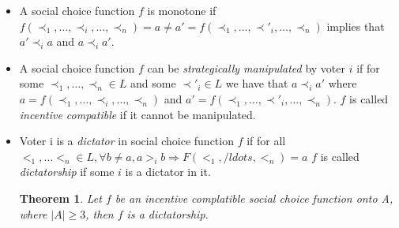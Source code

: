 \documentclass{article}
\newtheorem{theorem}{Theorem}
\theoremstyle{definition}
\begin{document}
\begin{itemize}
\item
A social choice function $f$ is monotone if
$f(\prec_1,\dots,\prec_i,\dots,\prec_n)=a\ne a'=f(\prec_1,\dots,\prec'_i,\dots,\prec_n)$
implies that $a'\prec_i a$ and $a\prec_i a'$.

\item
A social choice function $f$ can be \emph{strategically manipulated} by
voter $i$ if for some $\prec_1,\dots,\prec_n\in L$ and some $\prec'_i\in L$
we have that $a \prec_i a'$ where $a=f(\prec_1,\dots,\prec_i,\dots,\prec_n)$
and $a'=f(\prec_1,\dots,\prec'_i,\dots,\prec_n)$.
$f$ is called \emph{incentive compatible} if it cannot be manipulated.

\item Voter i is a \emph{dictator} in social choice function $f$ if for all
$<_1, \ldots <_n \in L, \forall b \neq a, a >_i b \Rightarrow F(<_1, /ldots, <_n) = a$
$f$ is called \emph{dictatorship} if some $i$ is a dictator in it.

\begin{theorem}
Let $f$ be an incentive complatible social choice function onto A, where $|A| \geq 3$, then $f$
is a dictatorship.
\end{theorem}

\end{itemize}
\end{document}
